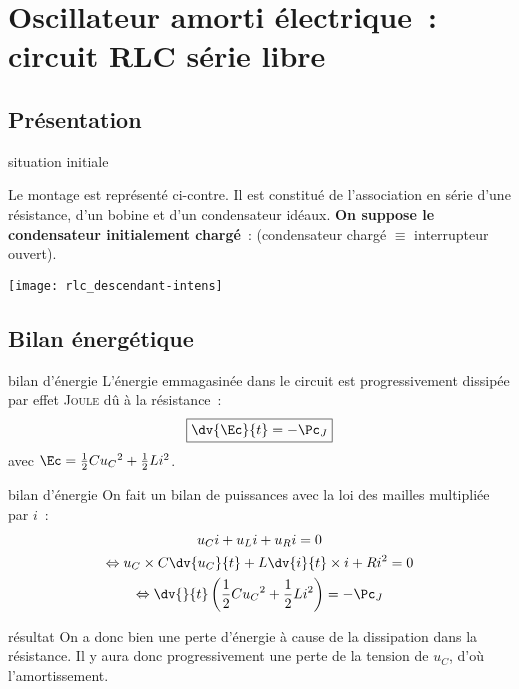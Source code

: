 \documentclass[../main/main.tex]{subfiles}
\begin{document}
\section{Oscillateur amorti électrique~: circuit RLC série libre}

\subsection{Présentation}
\begin{defi}[label=def:echelonC, sidebyside, righthand width=.3\linewidth]
    {situation initiale}

    Le montage est représenté ci-contre. Il est constitué de l'association en
    série d'une résistance, d'un bobine et d'un condensateur idéaux. \textbf{On
    suppose le condensateur initialement chargé}~:  (condensateur chargé $\equiv$ interrupteur
    ouvert).

    \tcblower
    \begin{center}
        \texttt{[image: rlc\_descendant-intens]}
    \end{center}
\end{defi}

\vspace{-15pt}
\subsection{Bilan énergétique}
\begin{tcbraster}[raster columns=2, raster equal height=rows]
    \begin{prop}[label=prop:lcenerg-décharge]{bilan d'énergie}
        L'énergie emmagasinée dans le circuit est progressivement dissipée par
        effet \textsc{Joule} dû à la résistance~:
        \[\boxed{\dv{\Ec}{t} = -\Pc_J}\]
        avec $\Ec = \frac{1}{2}Cu_C{}^2 + \frac{1}{2}Li^2$.
    \end{prop}
    \begin{demo}[label=demo:rcenerg-charge]{bilan d'énergie}
        On fait un bilan de puissances avec la loi des mailles multipliée par $i$~:
        \begin{gather*}
            u_Ci + u_Li + u_Ri= 0\\
            \Leftrightarrow u_C\times C \dv{u_C}{t} + L \dv{i}{t}\times i + Ri^2 = 0\\
            \Leftrightarrow \dv{}{t} \left( \frac{1}{2}Cu_C{}^2 +
            \frac{1}{2}Li^2 \right) = -\Pc_J
        \end{gather*}
    \end{demo}
\end{tcbraster}
\begin{impo}[label=impo:amortissement]{résultat}
    On a donc bien une perte d'énergie à cause de la dissipation dans la
    résistance. Il y aura donc progressivement une perte de la tension
    de $u_C$, d'où l'amortissement.
\end{impo}
\end{document}
